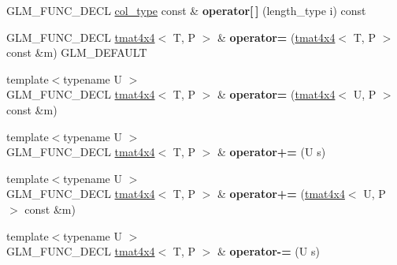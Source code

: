 \begin{DoxyCompactItemize}
\item 
\hypertarget{structglm_1_1tmat4x4_a2e54583cff9e350810ada5dbd693d1c7}{G\-L\-M\-\_\-\-F\-U\-N\-C\-\_\-\-D\-E\-C\-L \hyperlink{structglm_1_1tvec4}{col\-\_\-type} const \& {\bfseries operator\mbox{[}$\,$\mbox{]}} (length\-\_\-type i) const }\label{structglm_1_1tmat4x4_a2e54583cff9e350810ada5dbd693d1c7}

\item 
\hypertarget{structglm_1_1tmat4x4_aeccf1c71ba2e06f4ce199da93767928e}{G\-L\-M\-\_\-\-F\-U\-N\-C\-\_\-\-D\-E\-C\-L \hyperlink{structglm_1_1tmat4x4}{tmat4x4}$<$ T, P $>$ \& {\bfseries operator=} (\hyperlink{structglm_1_1tmat4x4}{tmat4x4}$<$ T, P $>$ const \&m) G\-L\-M\-\_\-\-D\-E\-F\-A\-U\-L\-T}\label{structglm_1_1tmat4x4_aeccf1c71ba2e06f4ce199da93767928e}

\item 
\hypertarget{structglm_1_1tmat4x4_af78f51e2bde3b85554c4f48bcca0cbf6}{{\footnotesize template$<$typename U $>$ }\\G\-L\-M\-\_\-\-F\-U\-N\-C\-\_\-\-D\-E\-C\-L \hyperlink{structglm_1_1tmat4x4}{tmat4x4}$<$ T, P $>$ \& {\bfseries operator=} (\hyperlink{structglm_1_1tmat4x4}{tmat4x4}$<$ U, P $>$ const \&m)}\label{structglm_1_1tmat4x4_af78f51e2bde3b85554c4f48bcca0cbf6}

\item 
\hypertarget{structglm_1_1tmat4x4_abc9e0d2f169a0a1040aafb8a8df0d4e7}{{\footnotesize template$<$typename U $>$ }\\G\-L\-M\-\_\-\-F\-U\-N\-C\-\_\-\-D\-E\-C\-L \hyperlink{structglm_1_1tmat4x4}{tmat4x4}$<$ T, P $>$ \& {\bfseries operator+=} (U s)}\label{structglm_1_1tmat4x4_abc9e0d2f169a0a1040aafb8a8df0d4e7}

\item 
\hypertarget{structglm_1_1tmat4x4_a64f3faf32fe23ebc92896ccf2199c372}{{\footnotesize template$<$typename U $>$ }\\G\-L\-M\-\_\-\-F\-U\-N\-C\-\_\-\-D\-E\-C\-L \hyperlink{structglm_1_1tmat4x4}{tmat4x4}$<$ T, P $>$ \& {\bfseries operator+=} (\hyperlink{structglm_1_1tmat4x4}{tmat4x4}$<$ U, P $>$ const \&m)}\label{structglm_1_1tmat4x4_a64f3faf32fe23ebc92896ccf2199c372}

\item 
\hypertarget{structglm_1_1tmat4x4_a2b6efc926899fe1c11355d187eec5d29}{{\footnotesize template$<$typename U $>$ }\\G\-L\-M\-\_\-\-F\-U\-N\-C\-\_\-\-D\-E\-C\-L \hyperlink{structglm_1_1tmat4x4}{tmat4x4}$<$ T, P $>$ \& {\bfseries operator-\/=} (U s)}\label{structglm_1_1tmat4x4_a2b6efc926899fe1c11355d187eec5d29}


\end{DoxyCompactItemize}
